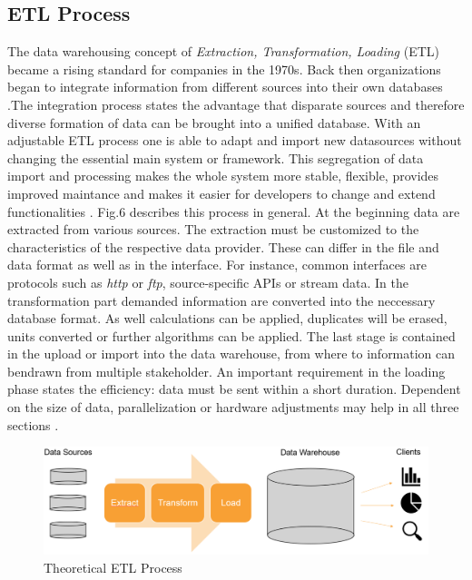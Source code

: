 \documentclass[conference, 11pt]{IEEEtran}
\begin{document}
\subsection{ETL Process}
The data warehousing concept of \textit{Extraction, Transformation, Loading} (ETL) became a rising standard for companies in the 1970s. Back then organizations began to integrate information from different sources into their own databases \cite{carl1}.\break The integration process states the advantage that disparate sources and therefore diverse formation of data can be brought into a unified database. With an adjustable ETL process one is able to adapt and import new datasources without 
changing the essential main system or framework. This segregation of data import and processing makes the whole system more stable, flexible, provides improved maintance and makes it easier for developers to change and extend functionalities \cite{carl2}. Fig.6 describes this process in general. At the beginning data are extracted from various sources. The extraction must be customized to the characteristics of the respective data provider. These can differ in the file and data format as well as in the interface. For instance, common interfaces are protocols such as \textit{http} or \textit{ftp}, source-specific APIs or stream data.
In the transformation part demanded information are converted into the neccessary database format. As well calculations can be applied, duplicates will be erased, units converted or further algorithms can be applied. 
The last stage is contained in the upload or import into the data warehouse, from where to information can bendrawn from multiple stakeholder. An important requirement in the loading phase states the efficiency: data must be sent within a short duration. Dependent on the size of data, parallelization or hardware adjustments may help in all three sections \cite{etlRef}. 
\linebreak




\vspace{0.5cm}
\begin{figure}[htbp]
\centerline{\includegraphics[scale=0.3]{Graphics/ETLTheory.PNG}}
\caption{Theoretical ETL Process}
\label{fig}
\end{figure}
\vspace{0.5cm}
\end{document}
